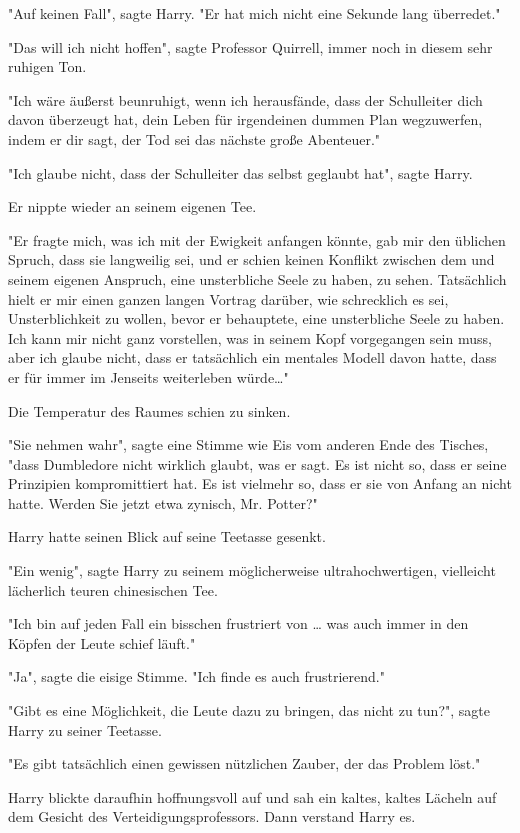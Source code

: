 {"Auf keinen Fall", sagte Harry. "Er hat mich nicht eine Sekunde lang überredet."

"Das will ich nicht hoffen", sagte Professor Quirrell, immer noch in diesem sehr ruhigen Ton.

"Ich wäre äußerst beunruhigt, wenn ich herausfände, dass der Schulleiter dich davon überzeugt hat, dein Leben für irgendeinen dummen Plan wegzuwerfen, indem er dir sagt, der Tod sei das nächste große Abenteuer."

"Ich glaube nicht, dass der Schulleiter das selbst geglaubt hat", sagte Harry.

Er nippte wieder an seinem eigenen Tee.

"Er fragte mich, was ich mit der Ewigkeit anfangen könnte, gab mir den üblichen Spruch, dass sie langweilig sei, und er schien keinen Konflikt zwischen dem und seinem eigenen Anspruch, eine unsterbliche Seele zu haben, zu sehen. Tatsächlich hielt er mir einen ganzen langen Vortrag darüber, wie schrecklich es sei, Unsterblichkeit zu wollen, bevor er behauptete, eine unsterbliche Seele zu haben. Ich kann mir nicht ganz vorstellen, was in seinem Kopf vorgegangen sein muss, aber ich glaube nicht, dass er tatsächlich ein mentales Modell davon hatte, dass er für immer im Jenseits weiterleben würde…"

Die Temperatur des Raumes schien zu sinken.

"Sie nehmen wahr", sagte eine Stimme wie Eis vom anderen Ende des Tisches, "dass Dumbledore nicht wirklich glaubt, was er sagt. Es ist nicht so, dass er seine Prinzipien kompromittiert hat. Es ist vielmehr so, dass er sie von Anfang an nicht hatte. Werden Sie jetzt etwa zynisch, Mr. Potter?"

Harry hatte seinen Blick auf seine Teetasse gesenkt.

"Ein wenig", sagte Harry zu seinem möglicherweise ultrahochwertigen, vielleicht lächerlich teuren chinesischen Tee.

"Ich bin auf jeden Fall ein bisschen frustriert von … was auch immer in den Köpfen der Leute schief läuft."

"Ja", sagte die eisige Stimme. "Ich finde es auch frustrierend."

"Gibt es eine Möglichkeit, die Leute dazu zu bringen, das nicht zu tun?", sagte Harry zu seiner Teetasse.

"Es gibt tatsächlich einen gewissen nützlichen Zauber, der das Problem löst."

Harry blickte daraufhin hoffnungsvoll auf und sah ein kaltes, kaltes Lächeln auf dem Gesicht des Verteidigungsprofessors. Dann verstand Harry es.

}
